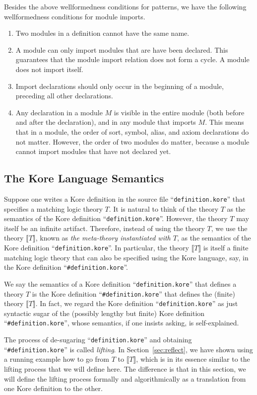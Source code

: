 \documentclass[UTF8,11pt]{article}
\theoremstyle{plain}
\theoremstyle{definition}
\theoremstyle{remark}
\newcommand{\Bracket}[1]{\llbracket#1\rrbracket}
\begin{document}
Besides the above wellformedness conditions for patterns, we have the following
wellformedness conditions for module imports.
\begin{enumerate} \itemsep0em
\item Two modules in a definition cannot have the same name.
\item A module can only import modules that are have been declared. This
guarantees that the module import relation does not form a cycle. A module does
not import itself.
\item Import declarations should only occur in the beginning of a module,
preceding all other declarations.
\item Any declaration in a module $M$ is visible in the entire module (both
before and after the declaration), and in any module that imports $M$. This
means that in a module, the order of sort, symbol, alias, and axiom
declarations do not matter. However, the order of two modules do matter,
because a module cannot import modules that have not declared yet.
\end{enumerate}


\subsection{The Kore Language Semantics}
\label{sec:kore-semantics}
Suppose one writes a Kore definition in the source file
``\verb|definition.kore|''
that specifies a matching logic theory $T$.
It is natural to think of the theory $T$ as the semantics of the Kore
definition ``\verb|definition.kore|''.
However, the theory $T$ may itself be an infinite artifact.
Therefore, instead of using the theory $T$, we use the theory $\Bracket{T}$,
known as \emph{the meta-theory instantiated with $T$},
as the semantics of the Kore definition
``\verb|definition.kore|''.
In particular, the theory $\Bracket{T}$ is itself a finite matching logic
theory that can also be specified using the Kore language, say, in the Kore
definition
``\verb|#definition.kore|''.

We say the semantics of a Kore definition ``\verb|definition.kore|'' that
defines a theory $T$ is the Kore definition ``\verb|#definition.kore|'' that
defines the (finite) theory $\Bracket{T}$.
In fact, we regard the Kore definition ``\verb|definition.kore|'' as just
syntactic sugar of the (possibly lengthy but finite) Kore definition
``\verb|#definition.kore|'', whose semantics, if one insists asking, is
self-explained.

The process of de-sugaring ``\verb|definition.kore|'' and obtaining
``\verb|#definition.kore|'' is called \emph{lifting}.
In Section~\ref{sec:reflect}, we have shown using a running example how to go
from $T$ to $\Bracket{T}$, which is in its essence similar to the lifting
process that we will define here.
The difference is that in this section, we will define the lifting process
formally and algorithmically as a translation from one Kore definition to the
other.
\end{document}
